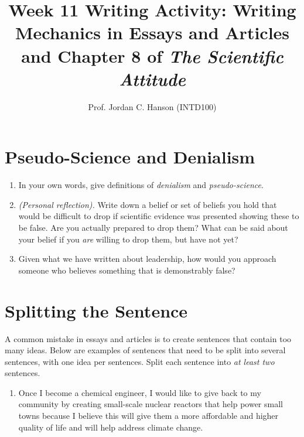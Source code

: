\documentclass{article}
\begin{document}
\title{Week 11 Writing Activity: Writing Mechanics in Essays and Articles and Chapter 8 of \textit{The Scientific Attitude}}
\author{Prof. Jordan C. Hanson (INTD100)}

\maketitle

\section{Pseudo-Science and Denialism}

\begin{enumerate}
\item In your own words, give definitions of \textit{denialism} and \textit{pseudo-science}. \\ \vspace{1cm}
\item \textit{(Personal reflection).} Write down a belief or set of beliefs you hold that would be difficult to drop if scientific evidence was presented showing these to be false.  Are you actually prepared to drop them?  What can be said about your belief if you \textit{are} willing to drop them, but have not yet? \\ \vspace{1.5cm}
\item Given what we have written about leadership, how would you approach someone who believes something that is demonstrably false? \\ \vspace{1.5cm}
\end{enumerate}

\section{Splitting the Sentence}

A common mistake in essays and articles is to create sentences that contain too many ideas.  Below are examples of sentences that need to be split into several sentences, with one idea per sentences.  Split each sentence into \textit{at least two} sentences.

\begin{enumerate}
\item Once I become a chemical engineer, I would like to give back to my community by creating small-scale nuclear reactors that help power small towns because I believe this will give them a more affordable and higher quality of life and will help address climate change. \\ \vspace{1cm}
\end{enumerate}
\end{document}
